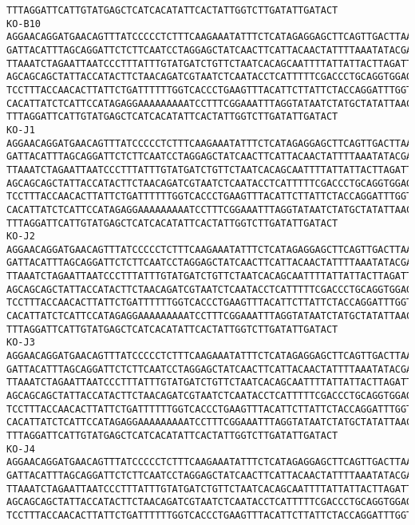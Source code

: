 \documentclass[11pt]{article}
\begin{document}
\begin{Verbatim}[commandchars=\\\{\}]
TTTAGGATTCATTGTATGAGCTCATCACATATTCACTATTGGTCTTGATATTGATACT
KO-B10
AGGAACAGGATGAACAGTTTATCCCCCTCTTTCAAGAAATATTTCTCATAGAGGAGCTTCAGTTGACTTAAGAATCTTCA
GATTACATTTAGCAGGATTCTCTTCAATCCTAGGAGCTATCAACTTCATTACAACTATTTTAAATATACGACCAAAAAAC
TTAAATCTAGAATTAATCCCTTTATTTGTATGATCTGTTCTAATCACAGCAATTTTATTATTACTTAGATTACCAGTCTT
AGCAGCAGCTATTACCATACTTCTAACAGATCGTAATCTCAATACCTCATTTTTCGACCCTGCAGGTGGAGGAGACCCAA
TCCTTTACCAACACTTATTCTGATTTTTTGGTCACCCTGAAGTTTACATTCTTATTCTACCAGGATTTGGTATTATTTCT
CACATTATCTCATTCCATAGAGGAAAAAAAAATCCTTTCGGAAATTTAGGTATAATCTATGCTATATTAACTATTGGAAT
TTTAGGATTCATTGTATGAGCTCATCACATATTCACTATTGGTCTTGATATTGATACT
KO-J1
AGGAACAGGATGAACAGTTTATCCCCCTCTTTCAAGAAATATTTCTCATAGAGGAGCTTCAGTTGACTTAAGAATCTTCA
GATTACATTTAGCAGGATTCTCTTCAATCCTAGGAGCTATCAACTTCATTACAACTATTTTAAATATACGACCAAAAAAC
TTAAATCTAGAATTAATCCCTTTATTTGTATGATCTGTTCTAATCACAGCAATTTTATTATTACTTAGATTACCAGTCTT
AGCAGCAGCTATTACCATACTTCTAACAGATCGTAATCTCAATACCTCATTTTTCGACCCTGCAGGTGGAGGAGACCCAA
TCCTTTACCAACACTTATTCTGATTTTTTGGTCACCCTGAAGTTTACATTCTTATTCTACCAGGATTTGGTATTATTTCT
CACATTATCTCATTCCATAGAGGAAAAAAAAATCCTTTCGGAAATTTAGGTATAATCTATGCTATATTAACTATTGGAAT
TTTAGGATTCATTGTATGAGCTCATCACATATTCACTATTGGTCTTGATATTGATACT
KO-J2
AGGAACAGGATGAACAGTTTATCCCCCTCTTTCAAGAAATATTTCTCATAGAGGAGCTTCAGTTGACTTAAGAATCTTCA
GATTACATTTAGCAGGATTCTCTTCAATCCTAGGAGCTATCAACTTCATTACAACTATTTTAAATATACGACCAAAAAAC
TTAAATCTAGAATTAATCCCTTTATTTGTATGATCTGTTCTAATCACAGCAATTTTATTATTACTTAGATTACCAGTCTT
AGCAGCAGCTATTACCATACTTCTAACAGATCGTAATCTCAATACCTCATTTTTCGACCCTGCAGGTGGAGGAGACCCAA
TCCTTTACCAACACTTATTCTGATTTTTTGGTCACCCTGAAGTTTACATTCTTATTCTACCAGGATTTGGTATTATTTCT
CACATTATCTCATTCCATAGAGGAAAAAAAAATCCTTTCGGAAATTTAGGTATAATCTATGCTATATTAACTATTGGAAT
TTTAGGATTCATTGTATGAGCTCATCACATATTCACTATTGGTCTTGATATTGATACT
KO-J3
AGGAACAGGATGAACAGTTTATCCCCCTCTTTCAAGAAATATTTCTCATAGAGGAGCTTCAGTTGACTTAAGAATCTTCA
GATTACATTTAGCAGGATTCTCTTCAATCCTAGGAGCTATCAACTTCATTACAACTATTTTAAATATACGACCAAAAAAC
TTAAATCTAGAATTAATCCCTTTATTTGTATGATCTGTTCTAATCACAGCAATTTTATTATTACTTAGATTACCAGTCTT
AGCAGCAGCTATTACCATACTTCTAACAGATCGTAATCTCAATACCTCATTTTTCGACCCTGCAGGTGGAGGAGACCCAA
TCCTTTACCAACACTTATTCTGATTTTTTGGTCACCCTGAAGTTTACATTCTTATTCTACCAGGATTTGGTATTATTTCT
CACATTATCTCATTCCATAGAGGAAAAAAAAATCCTTTCGGAAATTTAGGTATAATCTATGCTATATTAACTATTGGAAT
TTTAGGATTCATTGTATGAGCTCATCACATATTCACTATTGGTCTTGATATTGATACT
KO-J4
AGGAACAGGATGAACAGTTTATCCCCCTCTTTCAAGAAATATTTCTCATAGAGGAGCTTCAGTTGACTTAAGAATCTTCA
GATTACATTTAGCAGGATTCTCTTCAATCCTAGGAGCTATCAACTTCATTACAACTATTTTAAATATACGACCAAAAAAC
TTAAATCTAGAATTAATCCCTTTATTTGTATGATCTGTTCTAATCACAGCAATTTTATTATTACTTAGATTACCAGTCTT
AGCAGCAGCTATTACCATACTTCTAACAGATCGTAATCTCAATACCTCATTTTTCGACCCTGCAGGTGGAGGAGACCCAA
TCCTTTACCAACACTTATTCTGATTTTTTGGTCACCCTGAAGTTTACATTCTTATTCTACCAGGATTTGGTATTATTTCT

\end{Verbatim}
\end{document}
